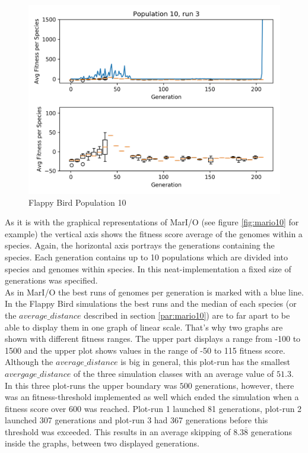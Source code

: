 \begin{figure}[h!]
				\begin{minipage}{0.33\textwidth}
					\centering
					\includegraphics[width=1\textwidth]{graphics/flappy/pop10_run3} %
				\end{minipage}
				\caption{Flappy Bird Population 10}
				\label{fig:flappy10}
			\end{figure}
			As it is with the graphical representations of MarI/O (see figure \ref{fig:mario10} for example) the vertical axis shows the fitness score average of the genomes within a species. Again, the horizontal axis portrays the generations containing the species. Each generation contains up to 10 populations which are divided into species and genomes within species. In this \gls{neat}-implementation a fixed size of generations was specified.\\
			As in MarI/O the best runs of genomes per generation is marked with a blue line. In the Flappy Bird simulations the best runs and the median of each species (or the $average\_distance$ described in section \ref{par:mario10}) are to far apart to be able to display them in one graph of linear scale. That's why two graphs are shown with different fitness ranges. The upper part displays a range from -100 to 1500 and the upper plot shows values in the range of -50 to 115 fitness score.\\
			Although the $average\_distance$  is big in general, this plot-run has the smallest $avergage\_distance$ of the three simulation classes with an average value of $51.3$.
			In this three plot-runs the upper boundary was $500$ generations, however, there was an fitness-threshold implemented as well which ended the simulation when a fitness score over 600 was reached. Plot-run 1 launched 81 generations, plot-run 2 launched 307 generations and plot-run 3 had 367 generations before this threshold was exceeded. This results in an average skipping of $8.3\overline{8}$ generations inside the graphs, between two displayed generations. \\
